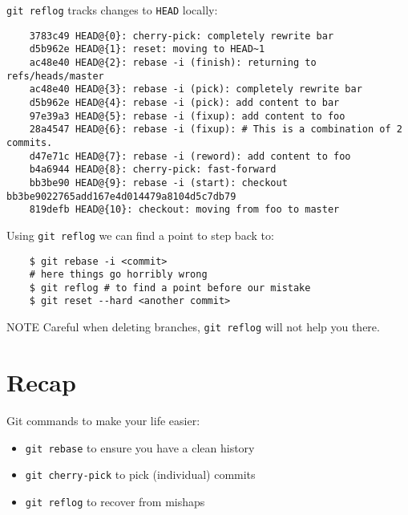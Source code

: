 \documentclass[11pt,xetex]{beamer}
\begin{document}
\begin{frame}[fragile]{}
  \Large
  \texttt{git reflog} tracks changes to
  \texttt{HEAD} locally:

  \begin{verbatim}
    3783c49 HEAD@{0}: cherry-pick: completely rewrite bar
    d5b962e HEAD@{1}: reset: moving to HEAD~1
    ac48e40 HEAD@{2}: rebase -i (finish): returning to refs/heads/master
    ac48e40 HEAD@{3}: rebase -i (pick): completely rewrite bar
    d5b962e HEAD@{4}: rebase -i (pick): add content to bar
    97e39a3 HEAD@{5}: rebase -i (fixup): add content to foo
    28a4547 HEAD@{6}: rebase -i (fixup): # This is a combination of 2 commits.
    d47e71c HEAD@{7}: rebase -i (reword): add content to foo
    b4a6944 HEAD@{8}: cherry-pick: fast-forward
    bb3be90 HEAD@{9}: rebase -i (start): checkout bb3be9022765add167e4d014479a8104d5c7db79
    819defb HEAD@{10}: checkout: moving from foo to master
  \end{verbatim}
\end{frame}

\begin{frame}[fragile]{}
  \Large
  Using \texttt{git reflog} we can find a point to step back
  to:

  \begin{verbatim}
    $ git rebase -i <commit>
    # here things go horribly wrong
    $ git reflog # to find a point before our mistake
    $ git reset --hard <another commit>
  \end{verbatim}
\end{frame}

\begin{frame}{}
  \begin{alertblock}{\Huge NOTE}
    Careful when deleting branches, \texttt{git reflog} will
    not help you there.
  \end{alertblock}
\end{frame}

\section*{Recap}

\begin{frame}{}
  \Large
  Git commands to make your life easier:

  \normalsize
  \begin{itemize}
    \item \texttt{git rebase} to ensure you have a clean history
    \item \texttt{git cherry-pick} to pick (individual) commits
    \item \texttt{git reflog} to recover from mishaps
  \end{itemize}
\end{frame}
\end{document}
